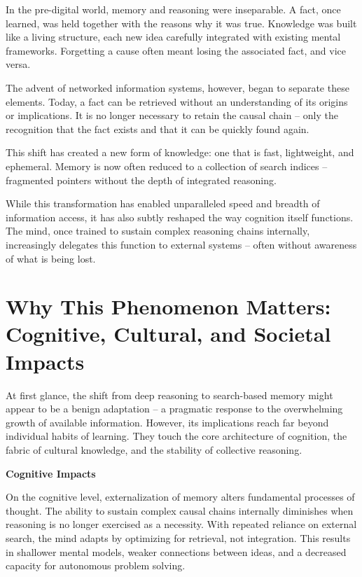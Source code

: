 In the pre-digital world, memory and reasoning were inseparable. A fact,
once learned, was held together with the reasons why it was true.
Knowledge was built like a living structure, each new idea carefully
integrated with existing mental frameworks. Forgetting a cause often
meant losing the associated fact, and vice versa.

The advent of networked information systems, however, began to separate
these elements. Today, a fact can be retrieved without an understanding
of its origins or implications. It is no longer necessary to retain the
causal chain -- only the recognition that the fact exists and that it can
be quickly found again.

This shift has created a new form of knowledge: one that is fast,
lightweight, and ephemeral. Memory is now often reduced to a collection
of search indices -- fragmented pointers without the depth of integrated
reasoning.

While this transformation has enabled unparalleled speed and breadth of
information access, it has also subtly reshaped the way cognition itself
functions. The mind, once trained to sustain complex reasoning chains
internally, increasingly delegates this function to external systems --
often without awareness of what is being lost.

\section{Why This Phenomenon Matters: Cognitive, Cultural, and Societal
  Impacts}

At first glance, the shift from deep reasoning to search-based memory
might appear to be a benign adaptation -- a pragmatic response to the
overwhelming growth of available information. However, its implications
reach far beyond individual habits of learning. They touch the core
architecture of cognition, the fabric of cultural knowledge, and the
stability of collective reasoning.

\textbf{Cognitive Impacts}

On the cognitive level, externalization of memory alters fundamental
processes of thought. The ability to sustain complex causal chains
internally diminishes when reasoning is no longer exercised as a
necessity. With repeated reliance on external search, the mind adapts by
optimizing for retrieval, not integration. This results in shallower
mental models, weaker connections between ideas, and a decreased
capacity for autonomous problem solving.

